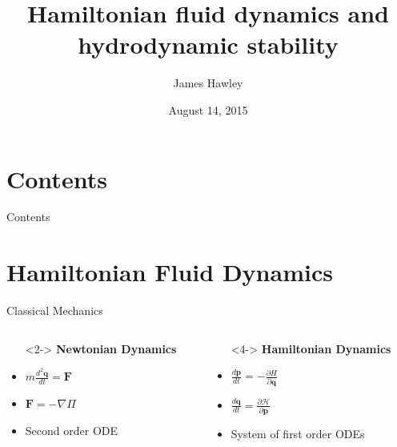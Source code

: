 \documentclass{beamer}
\title{Hamiltonian fluid dynamics and hydrodynamic stability}
\author{James Hawley}
\date{August 14, 2015}
\institute{University of Waterloo}
\begin{document}
	\begin{frame}
		\titlepage
	\end{frame}

	\section*{Contents}
		\begin{frame}{Contents}
			\tableofcontents
		\end{frame}

	\section{Hamiltonian Fluid Dynamics}
	\setcounter{subsection}{1}
		\begin{frame}[t]{Classical Mechanics}
			\begin{columns}
				\begin{column}{0.5\textwidth}
					\begin{itemize}
						\item[]<2-> \textbf{Newtonian Dynamics}
						\item<3-> $m\frac{d^2 \mathbf{q}}{dt} = \mathbf{F}$
						\item<3-> $\mathbf{F} = -\nabla \Pi$
						\item<3-> Second order ODE
					\end{itemize}
				\end{column}
				\begin{column}{0.5\textwidth}
					\begin{itemize}
						\item[]<4-> \textbf{Hamiltonian Dynamics}
						\item<5-> $\frac{d \mathbf{p}}{dt} = -\frac{\partial H}{\partial \mathbf{q}}$
						\item<5-> $\frac{d \mathbf{q}}{dt} = \frac{\partial \mathcal{H}}{\partial \mathbf{p}}$
						\item<5-> System of first order ODEs
					\end{itemize}
				\end{column}
			\end{columns}
		\end{frame}
\end{document}
